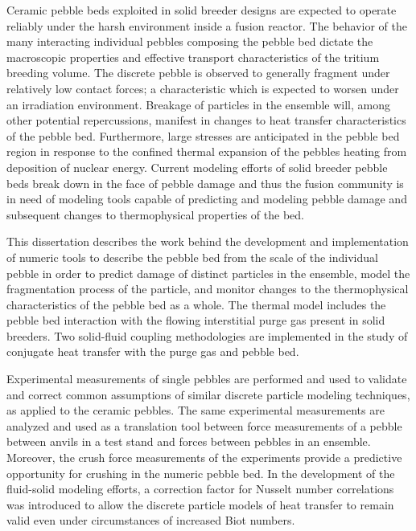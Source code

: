 Ceramic pebble beds exploited in solid breeder designs are expected to operate reliably under the harsh environment inside a fusion reactor. The behavior of the many interacting individual pebbles composing the pebble bed dictate the macroscopic properties and effective transport characteristics of the tritium breeding volume. The discrete pebble is observed to generally fragment under relatively low contact forces; a characteristic which is expected to worsen under an irradiation environment. Breakage of particles in the ensemble will, among other potential repercussions, manifest in changes to heat transfer characteristics of the pebble bed. Furthermore, large stresses are anticipated in the pebble bed region in response to the confined thermal expansion of the pebbles heating from deposition of nuclear energy. Current modeling efforts of solid breeder pebble beds break down in the face of pebble damage and thus the fusion community is in need of modeling tools capable of predicting and modeling pebble damage and subsequent changes to thermophysical properties of the bed.

This dissertation describes the work behind the development and implementation of numeric tools to describe the pebble bed from the scale of the individual pebble in order to predict damage of distinct particles in the ensemble, model the fragmentation process of the particle, and monitor changes to the thermophysical characteristics of the pebble bed as a whole. The thermal model includes the pebble bed interaction with the flowing interstitial purge gas present in solid breeders. Two solid-fluid coupling methodologies are implemented in the study of conjugate heat transfer with the purge gas and pebble bed.

Experimental measurements of single pebbles are performed and used to validate and correct common assumptions of similar discrete particle modeling techniques, as applied to the ceramic pebbles. The same experimental measurements are analyzed and used as a translation tool between force measurements of a pebble between anvils in a test stand and forces between pebbles in an ensemble. Moreover, the crush force measurements of the experiments provide a predictive opportunity for crushing in the numeric pebble bed. In the development of the fluid-solid modeling efforts, a correction factor for Nusselt number correlations was introduced to allow the discrete particle models of heat transfer to remain valid even under circumstances of increased Biot numbers.


